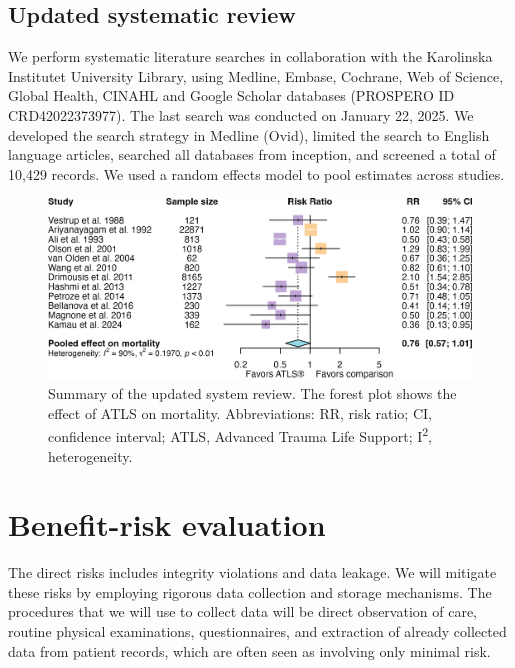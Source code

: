 \documentclass[
]{scrartcl}
\begin{document}
\hypertarget{updated-systematic-review}{%
\subsection{Updated systematic review}\label{updated-systematic-review}}

We perform systematic literature searches in collaboration with the
Karolinska Institutet University Library, using Medline, Embase,
Cochrane, Web of Science, Global Health, CINAHL and Google Scholar
databases (PROSPERO ID CRD42022373977). The last search was conducted on
January 22, 2025. We developed the search strategy in Medline (Ovid),
limited the search to English language articles, searched all databases
from inception, and screened a total of 10,429 records. We used a random
effects model to pool estimates across studies.

\begin{figure}

{\centering \includegraphics[width=5.81in,height=\textheight]{forest-plot.png}

}

\caption{\label{fig-forest-plot}Summary of the updated system review.
The forest plot shows the effect of ATLS on mortality. Abbreviations:
RR, risk ratio; CI, confidence interval; ATLS, Advanced Trauma Life
Support; I\textsuperscript{2}, heterogeneity.}

\end{figure}

\hypertarget{benefit-risk-evaluation}{%
\section{Benefit-risk evaluation}\label{benefit-risk-evaluation}}

The direct risks includes integrity violations and data leakage. We will
mitigate these risks by employing rigorous data collection and storage
mechanisms. The procedures that we will use to collect data will be
direct observation of care, routine physical examinations,
questionnaires, and extraction of already collected data from patient
records, which are often seen as involving only minimal risk.
\end{document}
